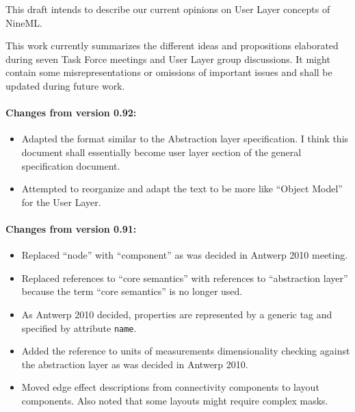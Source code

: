 \documentclass{article}
\begin{document}
\newpage
\pagestyle{plain}

\tableofcontents
\newpage

\abstract
This draft intends to describe our current opinions on User Layer concepts
of NineML.

This work currently summarizes the different ideas and propositions elaborated
during seven Task Force meetings and User Layer group discussions. It might
contain some misrepresentations or omissions of important issues and shall be
updated during future work.

\vskip 1in

\paragraph{Changes from version 0.92:}
\begin{itemize}
\item Adapted the format similar to the Abstraction layer specification.
I think this document shall essentially become user layer section of the
general specification document.
\item Attempted to reorganize and adapt the text to be more like ``Object
Model'' for the User Layer.
\end{itemize}

\paragraph{Changes from version 0.91:}
\begin{itemize}
\item Replaced ``node'' with ``component'' as was decided in Antwerp 2010
meeting.
\item Replaced references to ``core semantics'' with references to
``abstraction layer''
because the term ``core semantics'' is no longer used.
\item As Antwerp 2010 decided, properties are represented by a generic
tag and specified
by attribute {\tt name}.
\item Added the reference to units of measurements dimensionality checking
against
the abstraction layer as was decided in Antwerp 2010.
\item Moved edge effect descriptions from connectivity components to layout
components. Also
noted that some layouts might require complex masks.
\end{itemize}
\end{document}
